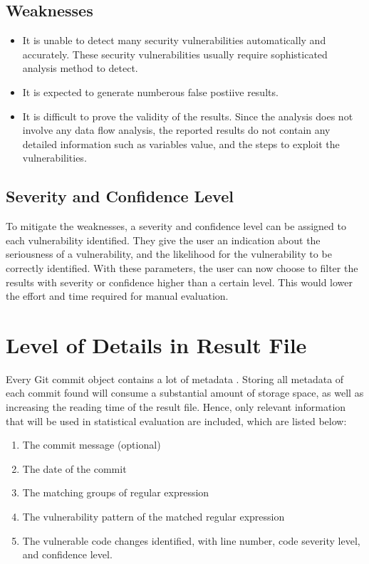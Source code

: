 \documentclass[12pt, a4paper]{report}
\begin{document}
\subsection*{Weaknesses}
\begin{itemize}
  \item It is unable to detect many security vulnerabilities automatically and accurately. These
  security vulnerabilities usually require sophisticated analysis method to detect.
  \item It is expected to generate numberous false postiive results.
  \item It is difficult to prove the validity of the results. Since the analysis does not involve
  any data flow analysis, the reported results do not contain any detailed information such as
  variables value, and the steps to exploit the vulnerabilities.
\end{itemize}

\subsection{Severity and Confidence Level}
To mitigate the weaknesses, a severity and confidence level can be assigned to each vulnerability
identified. They give the user an indication about the seriousness of a vulnerability, and the
likelihood for the vulnerability to be correctly identified. With these parameters, the user can now
choose to filter the results with severity or confidence higher than a certain level. This would
lower the effort and time required for manual evaluation.

\section{Level of Details in Result File}
Every Git commit object contains a lot of metadata \cite{chacon_2014}. Storing all metadata of each
commit found will consume a substantial amount of storage space, as well as increasing the reading
time of the result file. Hence, only relevant information that will be used in statistical
evaluation are included, which are listed below:
\begin{enumerate}
  \item The commit message (optional)
  \item The date of the commit
  \item The matching groups of regular expression
  \item The vulnerability pattern of the matched regular expression
  \item The vulnerable code changes identified, with line number, code severity level, and
  confidence level.
\end{enumerate}
\end{document}
